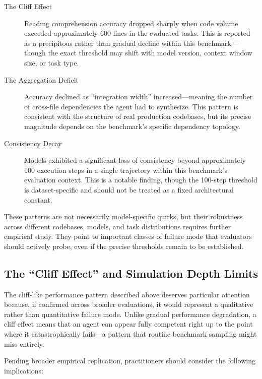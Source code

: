 \begin{description}
    \item[The Cliff Effect] Reading comprehension accuracy dropped sharply when code volume exceeded approximately 600 lines in the evaluated tasks. This is reported as a precipitous rather than gradual decline within this benchmark---though the exact threshold may shift with model version, context window size, or task type.
    \item[The Aggregation Deficit] Accuracy declined as ``integration width'' increased---meaning the number of cross-file dependencies the agent had to synthesize. This pattern is consistent with the structure of real production codebases, but its precise magnitude depends on the benchmark's specific dependency topology.
    \item[Consistency Decay] Models exhibited a significant loss of consistency beyond approximately 100 execution steps in a single trajectory within this benchmark's evaluation context. This is a notable finding, though the 100-step threshold is dataset-specific and should not be treated as a fixed architectural constant.
\end{description}

These patterns are not necessarily model-specific quirks, but their robustness across different codebases, models, and task distributions requires further empirical study. They point to important classes of failure mode that evaluators should actively probe, even if the precise thresholds remain to be established.

\subsection{The ``Cliff Effect'' and Simulation Depth Limits}

The cliff-like performance pattern described above deserves particular attention because, if confirmed across broader evaluations, it would represent a qualitative rather than quantitative failure mode. Unlike gradual performance degradation, a cliff effect means that an agent can appear fully competent right up to the point where it catastrophically fails---a pattern that routine benchmark sampling might miss entirely.

Pending broader empirical replication, practitioners should consider the following implications:

